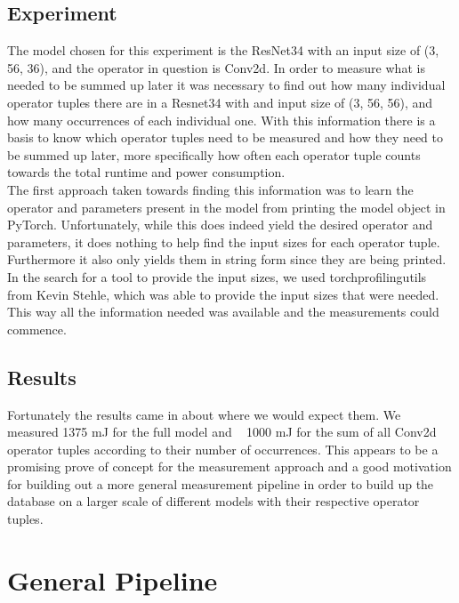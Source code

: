 \documentclass[conference]{IEEEtran}
\begin{document}
\subsection{Experiment}
The model chosen for this experiment is the ResNet34 with an input size of (3, 56, 36), and the operator in question is Conv2d. In order to measure what is needed to be summed up later it was necessary to find out how many individual operator tuples there are in a Resnet34 with and input size of (3, 56, 56), and how many occurrences of each individual one. With this information there is a basis to know which operator tuples need to be measured and how they need to be summed up later, more specifically how often each operator tuple counts towards the total runtime and power consumption. \\
The first approach taken towards finding this information was to learn the operator and parameters present in the model from printing the model object in PyTorch. Unfortunately, while this does indeed yield the desired operator and parameters, it does nothing to help find the input sizes for each operator tuple. Furthermore it also only yields them in string form since they are being printed.  In the search for a tool to provide the input sizes, we used torchprofilingutils from Kevin Stehle, which was able to provide the input sizes that were needed. This way all the information needed was available and the measurements could commence. 

\subsection{Results}
Fortunately the results came in about where we would expect them. We measured 1375 mJ for the full model and ~ 1000 mJ for the sum of all Conv2d operator tuples according to their number of occurrences.
This appears to be a promising prove of concept for the measurement approach and a good motivation for building out a more general measurement pipeline in order to build up the database on a larger scale of different models with their respective operator tuples. 

\section{General Pipeline}
\end{document}
